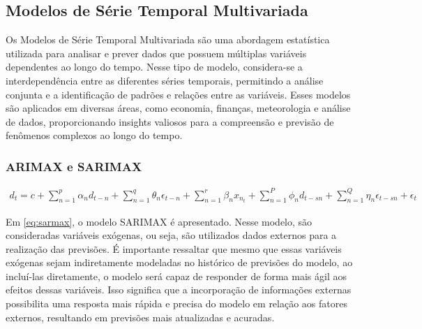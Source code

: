 \subsection{Modelos de S\'erie Temporal Multivariada}\label{subsec:mult}

Os Modelos de Série Temporal Multivariada são uma abordagem estatística utilizada para analisar e prever dados que possuem múltiplas variáveis dependentes ao longo do tempo. Nesse tipo de modelo, considera-se a interdependência entre as diferentes séries temporais, permitindo a análise conjunta e a identificação de padrões e relações entre as variáveis. Esses modelos são aplicados em diversas áreas, como economia, finanças, meteorologia e análise de dados, proporcionando insights valiosos para a compreensão e previsão de fenômenos complexos ao longo do tempo.

\subsubsection{ARIMAX e SARIMAX}

\begin{eqnarray}
	d_t=c+\sum_{n=1}^p \alpha_n d_{t-n}+\sum_{n=1}^q \theta_n \epsilon_{t-n}+\sum_{n=1}^r \beta_n x_{n_t}+\sum_{n=1}^P \phi_n d_{t-s n}+\sum_{n=1}^Q \eta_n \epsilon_{t-s n}+\epsilon_t \label{eq:sarmax}
\end{eqnarray}

Em \eqref{eq:sarmax}, o modelo SARIMAX é apresentado. Nesse modelo, são consideradas variáveis exógenas, ou seja, são utilizados dados externos para a realização das previsões. É importante ressaltar que mesmo que essas variáveis exógenas sejam indiretamente modeladas no histórico de previsões do modelo, ao incluí-las diretamente, o modelo será capaz de responder de forma mais ágil aos efeitos dessas variáveis. Isso significa que a incorporação de informações externas possibilita uma resposta mais rápida e precisa do modelo em relação aos fatores externos, resultando em previsões mais atualizadas e acuradas.

